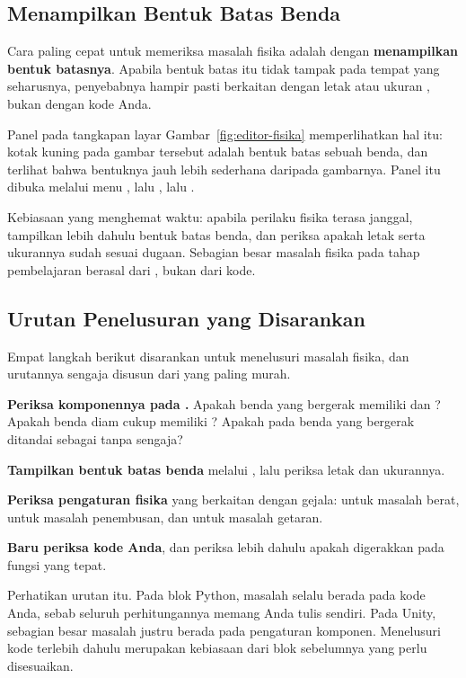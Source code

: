 \subsection{Menampilkan Bentuk Batas Benda}

Cara paling cepat untuk memeriksa masalah fisika adalah dengan
\textbf{menampilkan bentuk batasnya}. Apabila bentuk batas itu tidak tampak
pada tempat yang seharusnya, penyebabnya hampir pasti berkaitan dengan letak
atau ukuran , bukan dengan kode Anda.

Panel  pada tangkapan layar
Gambar~\ref{fig:editor-fisika} memperlihatkan hal itu: kotak kuning pada gambar
tersebut adalah bentuk batas sebuah benda, dan terlihat bahwa bentuknya jauh
lebih sederhana daripada gambarnya. Panel itu dibuka melalui menu
, lalu , lalu .

\begin{tipsbox}
Kebiasaan yang menghemat waktu: apabila perilaku fisika terasa janggal,
tampilkan lebih dahulu bentuk batas benda, dan periksa apakah letak serta
ukurannya sudah sesuai dugaan. Sebagian besar masalah fisika pada tahap
pembelajaran berasal dari , bukan dari kode.
\end{tipsbox}

\subsection{Urutan Penelusuran yang Disarankan}

Empat langkah berikut disarankan untuk menelusuri masalah fisika, dan
urutannya sengaja disusun dari yang paling murah.

\begin{langkah}
  \item \textbf{Periksa komponennya pada .} Apakah benda
        yang bergerak memiliki  dan ?
        Apakah benda diam cukup memiliki ? Apakah
         pada benda yang bergerak ditandai sebagai
         tanpa sengaja?
  \item \textbf{Tampilkan bentuk batas benda} melalui ,
        lalu periksa letak dan ukurannya.
  \item \textbf{Periksa pengaturan fisika} yang berkaitan dengan gejala:
         untuk masalah berat,  untuk masalah penembusan, dan  untuk
        masalah getaran.
  \item \textbf{Baru periksa kode Anda}, dan periksa lebih dahulu apakah
         digerakkan pada fungsi yang tepat.
\end{langkah}

\begin{peringatanbox}
Perhatikan urutan itu. Pada blok Python, masalah selalu berada pada kode Anda,
sebab seluruh perhitungannya memang Anda tulis sendiri. Pada Unity, sebagian
besar masalah justru berada pada pengaturan komponen. Menelusuri kode terlebih
dahulu merupakan kebiasaan dari blok sebelumnya yang perlu disesuaikan.
\end{peringatanbox}
